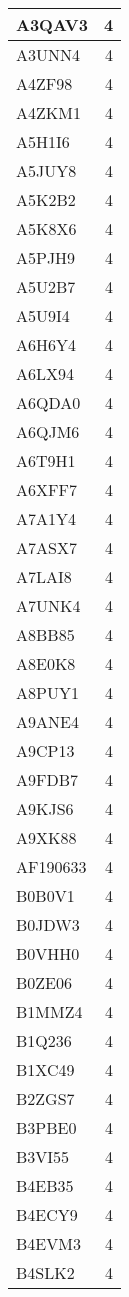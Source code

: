 \documentclass[
]{book}
\theoremstyle{definition}
\theoremstyle{definition}
\theoremstyle{definition}
\theoremstyle{definition}
\theoremstyle{remark}
\begin{document}
\begin{table}
\begin{tabular}{l|r}
\hline
A3QAV3 & 4\\
\hline
A3UNN4 & 4\\
\hline
A4ZF98 & 4\\
\hline
A4ZKM1 & 4\\
\hline
A5H1I6 & 4\\
\hline
A5JUY8 & 4\\
\hline
A5K2B2 & 4\\
\hline
A5K8X6 & 4\\
\hline
A5PJH9 & 4\\
\hline
A5U2B7 & 4\\
\hline
A5U9I4 & 4\\
\hline
A6H6Y4 & 4\\
\hline
A6LX94 & 4\\
\hline
A6QDA0 & 4\\
\hline
A6QJM6 & 4\\
\hline
A6T9H1 & 4\\
\hline
A6XFF7 & 4\\
\hline
A7A1Y4 & 4\\
\hline
A7ASX7 & 4\\
\hline
A7LAI8 & 4\\
\hline
A7UNK4 & 4\\
\hline
A8BB85 & 4\\
\hline
A8E0K8 & 4\\
\hline
A8PUY1 & 4\\
\hline
A9ANE4 & 4\\
\hline
A9CP13 & 4\\
\hline
A9FDB7 & 4\\
\hline
A9KJS6 & 4\\
\hline
A9XK88 & 4\\
\hline
AF190633 & 4\\
\hline
B0B0V1 & 4\\
\hline
B0JDW3 & 4\\
\hline
B0VHH0 & 4\\
\hline
B0ZE06 & 4\\
\hline
B1MMZ4 & 4\\
\hline
B1Q236 & 4\\
\hline
B1XC49 & 4\\
\hline
B2ZGS7 & 4\\
\hline
B3PBE0 & 4\\
\hline
B3VI55 & 4\\
\hline
B4EB35 & 4\\
\hline
B4ECY9 & 4\\
\hline
B4EVM3 & 4\\
\hline
B4SLK2 & 4\\

\end{tabular}
\end{table}
\end{document}
